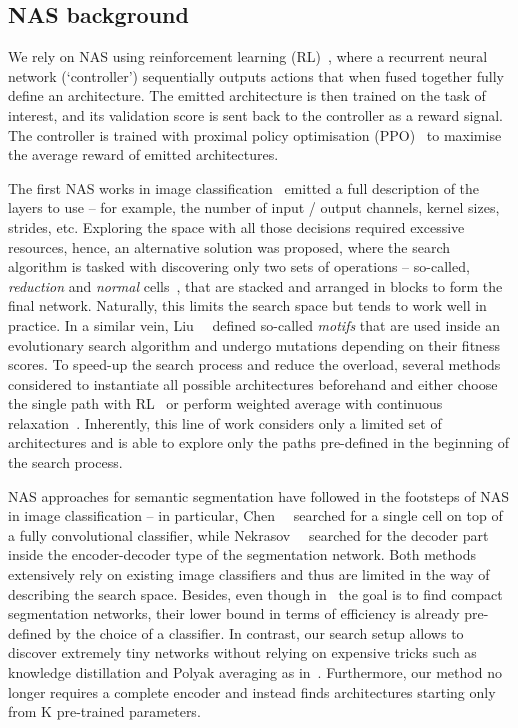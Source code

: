 \documentclass[10pt,twocolumn,letterpaper]{article}
\begin{document}
\subsection*{NAS background}

We rely on NAS using reinforcement learning (RL)~\cite{ZophVSL17}, where a recurrent neural network (`controller') sequentially outputs actions that when fused together fully define an architecture. The emitted architecture is then trained on the task of interest, and its validation score is sent back to the controller as a reward signal. The controller is trained with proximal policy optimisation (PPO)~\cite{SchulmanWDRK17} to maximise the average reward of emitted architectures.

The first NAS works in image classification~\cite{ZophL16} emitted a full description of the layers to use -- for example, the number of input / output channels, kernel sizes, strides, etc. Exploring the space with all those decisions required excessive resources, hence, an alternative solution was proposed, where the search algorithm is tasked with discovering only two sets of operations -- so-called, \emph{reduction} and \emph{normal} cells~\cite{ZophVSL17}, that are stacked and arranged in blocks to form the final network. Naturally, this limits the search space but tends to work well in practice. In a similar vein, Liu~\etal~\cite{abs-1711-00436} defined so-called \emph{motifs} that are used inside an evolutionary search algorithm and undergo mutations depending on their fitness scores. To speed-up the search process and reduce the overload, several methods considered to instantiate all possible architectures beforehand and either choose the single path with RL~\cite{PhamGZLD18} or perform weighted average with continuous relaxation~\cite{abs-1806-09055}. Inherently, this line of work considers only a limited set of architectures and is able to explore only the paths pre-defined in the beginning of the search process.

NAS approaches for semantic segmentation have followed in the footsteps of NAS in image classification -- in particular, Chen~\etal~\cite{abs-1809-04184} searched for a single cell on top of a fully convolutional classifier, while Nekrasov~\etal~\cite{abs-1810-10804} searched for the decoder part inside the encoder-decoder type of the segmentation network. Both methods extensively rely on existing image classifiers and thus are limited in the way of describing the search space. Besides, even though in~\cite{abs-1810-10804} the goal is to find compact segmentation networks, their lower bound in terms of efficiency is already pre-defined by the choice of a classifier. In contrast, our search setup allows to discover extremely tiny networks without relying on expensive tricks such as knowledge distillation and Polyak averaging as in~\cite{abs-1810-10804}. Furthermore, our method no longer requires a complete encoder and instead finds architectures starting only from K pre-trained parameters.
\end{document}
